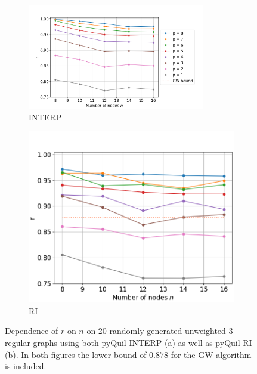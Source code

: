 \begin{figure}[H]
	\begin{subfigure}[t]{0.62\textwidth}
		\centering
		\includegraphics[width=0.85\textwidth]{figures/interp/INT_n_dependence.png}
		\captionsetup{justification=centering}
		\caption{INTERP $\qquad$ $\qquad$}
		\label{fig:r-n_dependence}
	\end{subfigure}
	\begin{subfigure}[t]{0.38\textwidth}
		\centering
		\includegraphics[width=\textwidth]{figures/RI/RI_n_dependence_3-regular_cut.png}
		\captionsetup{justification=centering}
		\caption{RI}
	\end{subfigure}
	\caption{Dependence of $r$ on $n$ on 20 randomly generated unweighted 3-regular graphs using both pyQuil INTERP (a) as well as pyQuil RI (b).  In both figures the lower bound of $0.878$ for the GW-algorithm is included.}
\end{figure}


